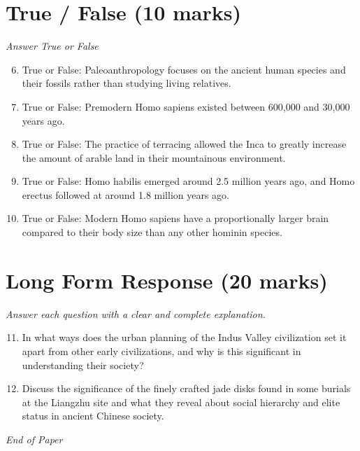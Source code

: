 \documentclass[12pt]{article}
\begin{document}
\section*{True / False (10 marks)}
\textit{Answer True or False}
\begin{enumerate}[label=\arabic*.]
\setcounter{enumi}{5}
\item True or False: Paleoanthropology focuses on the ancient human species and their fossils rather than studying living relatives.
\item True or False: Premodern Homo sapiens existed between 600,000 and 30,000 years ago.
\item True or False: The practice of terracing allowed the Inca to greatly increase the amount of arable land in their mountainous environment.
\item True or False: Homo habilis emerged around 2.5 million years ago, and Homo erectus followed at around 1.8 million years ago.
\item True or False: Modern Homo sapiens have a proportionally larger brain compared to their body size than any other hominin species.
\end{enumerate}

\section*{Long Form Response (20 marks)}
\textit{Answer each question with a clear and complete explanation.}
\begin{enumerate}[label=\arabic*.]
\setcounter{enumi}{10}
\item In what ways does the urban planning of the Indus Valley civilization set it apart from
other early civilizations, and why is this significant in understanding their society?
\item Discuss the significance of the finely crafted jade disks found in some burials at the
Liangzhu site and what they reveal about social hierarchy and elite status in ancient
Chinese society.
\end{enumerate}

\vfill
\noindent\textit{End of Paper}
\end{document}
